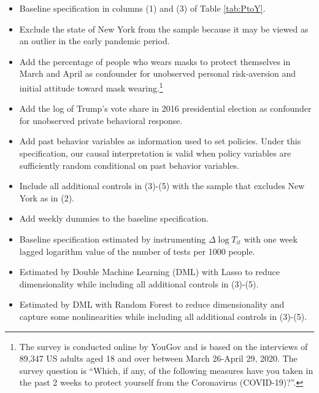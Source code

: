 \documentclass[11pt,reqno,letter]{amsart}
\theoremstyle{definition}
\begin{document}
  \begin{itemize}
  \item[(1)] Baseline specification  in columns (1) and (3) of Table  \ref{tab:PtoY}.
  \item[(2)]  Exclude  the state of New York from the sample because it may be viewed as an outlier in the early pandemic period.
  \item[(3)]   Add  the percentage of people who wears masks to protect themselves in March and April as confounder for unobserved  personal risk-aversion and initial attitude toward mask wearing.\footnote{ The survey is conducted online by YouGov and is based on the interviews of 89,347 US adults aged 18 and over between March 26-April 29, 2020.  The survey question is ``Which, if any, of the following measures have you taken in the past 2 weeks to protect yourself from the Coronavirus (COVID-19)?''.}
   \item[(4)]   Add the log of Trump's vote share  in 2016 presidential election as confounder for unobserved private behavioral response.
   \item[(5)]   Add  past behavior variables  as information used to set policies. Under this specification, our causal interpretation is valid when policy variables are sufficiently random conditional on past behavior variables.
   \item[(6)]   Include all additional controls in (3)-(5) with the sample that excludes New York as in (2).
   \item[(7)] Add weekly dummies  to the baseline specification.
   \item[(8)] Baseline specification estimated by instrumenting $\Delta \log T_{it}$ with one week lagged  logarithm  value of the number of tests per 1000 people.
   \item[(9)]   Estimated by Double Machine Learning (DML) \citep[e.g.,][]{chernozhukov18} with Lasso to reduce dimensionality while including all additional controls in (3)-(5).     \item[(10)]  Estimated by DML with Random Forest to reduce dimensionality  and capture some nonlinearities while including all additional controls in (3)-(5).   %
  \end{itemize}
\end{document}
